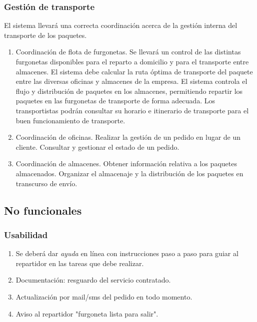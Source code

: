 \subsubsection{Gestión de transporte}
El sistema llevará una correcta coordinación acerca de la gestión interna del transporte de los paquetes.
\begin{enumerate}
	\item Coordinación de flota de furgonetas.
	\subitem Se llevará un control de las distintas furgonetas disponibles para el reparto a domicilio y para el transporte entre almacenes.
	\subitem El sistema debe calcular la ruta óptima de transporte del paquete entre las diversas oficinas y almacenes de la empresa. 
	\subitem El sistema controla el flujo y distribución de paquetes en los almacenes, permitiendo repartir los paquetes en las furgonetas de transporte de forma adecuada.
 	\subitem Los transportistas podrán consultar su horario e itinerario de transporte para el buen funcionamiento de transporte.

	\item Coordinación de oficinas.
	\subitem Realizar la gestión de un pedido en lugar de un cliente.
	\subitem Consultar y gestionar el estado de un pedido.
	
	\item Coordinación de almacenes.
	\subitem Obtener información relativa a los paquetes almacenados.
	\subitem Organizar el almacenaje y la distribución de los paquetes en transcurso de envío.
\end{enumerate}

\subsection{No funcionales}
\subsubsection{Usabilidad}
\begin{enumerate}
	\item Se deberá dar \textit{ayuda} en línea con instrucciones paso a paso para guiar al repartidor en las tareas que debe realizar.
	\item Documentación: resguardo del servicio contratado.
	\item Actualización por mail/sms del pedido en todo momento.
	\item Aviso al repartidor "furgoneta lista para salir".
	
\end{enumerate}
